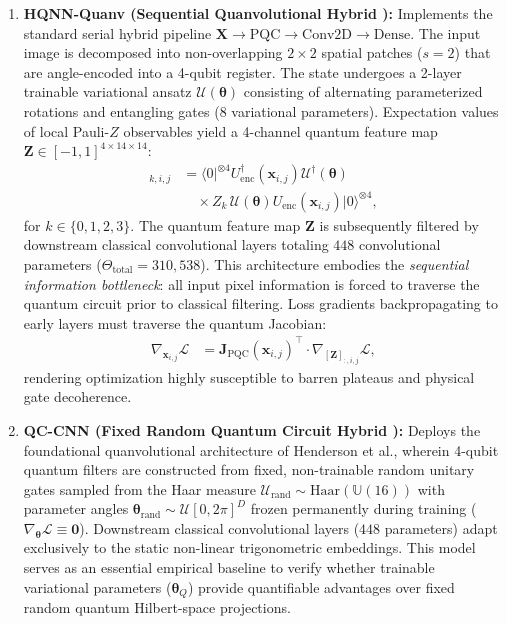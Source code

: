 \documentclass[journal]{IEEEtran}
\begin{document}
\begin{enumerate}
    \item \textbf{HQNN-Quanv (Sequential Quanvolutional Hybrid \cite{senokosov2024quantum}):} Implements the standard serial hybrid pipeline $\mathbf{X} \to \mathrm{PQC} \to \mathrm{Conv2D} \to \mathrm{Dense}$. The input image is decomposed into non-overlapping $2 \times 2$ spatial patches ($s=2$) that are angle-encoded into a 4-qubit register. The state undergoes a 2-layer trainable variational ansatz $\mathcal{U}(\boldsymbol{\theta})$ consisting of alternating parameterized rotations and entangling gates ($8$ variational parameters). Expectation values of local Pauli-$Z$ observables yield a 4-channel quantum feature map $\mathbf{Z} \in [-1, 1]^{4 \times 14 \times 14}$:
    \begin{align}
    [\mathbf{Z}]_{k, i, j} &= \langle 0|^{\otimes 4} U_{\mathrm{enc}}^\dagger(\mathbf{x}_{i,j}) \mathcal{U}^\dagger(\boldsymbol{\theta}) \nonumber \\
    &\quad \times Z_k \, \mathcal{U}(\boldsymbol{\theta}) U_{\mathrm{enc}}(\mathbf{x}_{i,j}) |0\rangle^{\otimes 4},
    \label{eq:hqnn_quanv_measurement}
    \end{align}
    for $k \in \{0, 1, 2, 3\}$. The quantum feature map $\mathbf{Z}$ is subsequently filtered by downstream classical convolutional layers totaling $448$ convolutional parameters ($\Theta_{\mathrm{total}} = 310{,}538$). This architecture embodies the \textit{sequential information bottleneck}: all input pixel information is forced to traverse the quantum circuit prior to classical filtering. Loss gradients backpropagating to early layers must traverse the quantum Jacobian:
    \begin{align}
    \nabla_{\mathbf{x}_{i,j}} \mathcal{L} &= \mathbf{J}_{\mathrm{PQC}}(\mathbf{x}_{i,j})^\top \cdot \nabla_{[\mathbf{Z}]_{:, i, j}} \mathcal{L},
    \label{eq:hqnn_jacobian_bottleneck}
    \end{align}
    rendering optimization highly susceptible to barren plateaus and physical gate decoherence.

    \item \textbf{QC-CNN (Fixed Random Quantum Circuit Hybrid \cite{henderson2020quanvolutional}):} Deploys the foundational quanvolutional architecture of Henderson et al., wherein 4-qubit quantum filters are constructed from fixed, non-trainable random unitary gates sampled from the Haar measure $\mathcal{U}_{\mathrm{rand}} \sim \mathrm{Haar}(\mathbb{U}(16))$ with parameter angles $\boldsymbol{\theta}_{\mathrm{rand}} \sim \mathcal{U}[0, 2\pi]^D$ frozen permanently during training ($\nabla_{\boldsymbol{\theta}} \mathcal{L} \equiv \mathbf{0}$). Downstream classical convolutional layers ($448$ parameters) adapt exclusively to the static non-linear trigonometric embeddings. This model serves as an essential empirical baseline to verify whether trainable variational parameters ($\boldsymbol{\theta}_Q$) provide quantifiable advantages over fixed random quantum Hilbert-space projections.


\end{enumerate}
\end{document}
